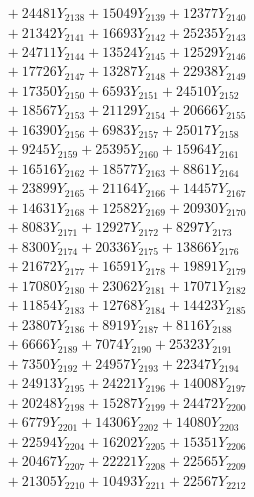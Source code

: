 \documentclass[a4paper,10pt]{article}
\begin{document}
{\begin{align}
&\;  + 24481 Y_{2138} + 15049 Y_{2139} + 12377 Y_{2140} \\[0.3ex]
&\;  + 21342 Y_{2141} + 16693 Y_{2142} + 25235 Y_{2143} \\[0.3ex]
&\;  + 24711 Y_{2144} + 13524 Y_{2145} + 12529 Y_{2146} \\[0.3ex]
&\;  + 17726 Y_{2147} + 13287 Y_{2148} + 22938 Y_{2149} \\[0.3ex]
&\;  + 17350 Y_{2150} + 6593 Y_{2151} + 24510 Y_{2152} \\[0.3ex]
&\;  + 18567 Y_{2153} + 21129 Y_{2154} + 20666 Y_{2155} \\[0.3ex]
&\;  + 16390 Y_{2156} + 6983 Y_{2157} + 25017 Y_{2158} \\[0.5ex]\allowbreak
&\;  + 9245 Y_{2159} + 25395 Y_{2160} + 15964 Y_{2161} \\[0.3ex]
&\;  + 16516 Y_{2162} + 18577 Y_{2163} + 8861 Y_{2164} \\[0.3ex]
&\;  + 23899 Y_{2165} + 21164 Y_{2166} + 14457 Y_{2167} \\[0.3ex]
&\;  + 14631 Y_{2168} + 12582 Y_{2169} + 20930 Y_{2170} \\[0.3ex]
&\;  + 8083 Y_{2171} + 12927 Y_{2172} + 8297 Y_{2173} \\[0.3ex]
&\;  + 8300 Y_{2174} + 20336 Y_{2175} + 13866 Y_{2176} \\[0.3ex]
&\;  + 21672 Y_{2177} + 16591 Y_{2178} + 19891 Y_{2179} \\[0.3ex]
&\;  + 17080 Y_{2180} + 23062 Y_{2181} + 17071 Y_{2182} \\[0.3ex]
&\;  + 11854 Y_{2183} + 12768 Y_{2184} + 14423 Y_{2185} \\[0.3ex]
&\;  + 23807 Y_{2186} + 8919 Y_{2187} + 8116 Y_{2188} \\[0.5ex]\allowbreak
&\;  + 6666 Y_{2189} + 7074 Y_{2190} + 25323 Y_{2191} \\[0.3ex]
&\;  + 7350 Y_{2192} + 24957 Y_{2193} + 22347 Y_{2194} \\[0.3ex]
&\;  + 24913 Y_{2195} + 24221 Y_{2196} + 14008 Y_{2197} \\[0.3ex]
&\;  + 20248 Y_{2198} + 15287 Y_{2199} + 24472 Y_{2200} \\[0.3ex]
&\;  + 6779 Y_{2201} + 14306 Y_{2202} + 14080 Y_{2203} \\[0.3ex]
&\;  + 22594 Y_{2204} + 16202 Y_{2205} + 15351 Y_{2206} \\[0.3ex]
&\;  + 20467 Y_{2207} + 22221 Y_{2208} + 22565 Y_{2209} \\[0.3ex]
&\;  + 21305 Y_{2210} + 10493 Y_{2211} + 22567 Y_{2212} \\[0.3ex]

\end{align}}
\end{document}

